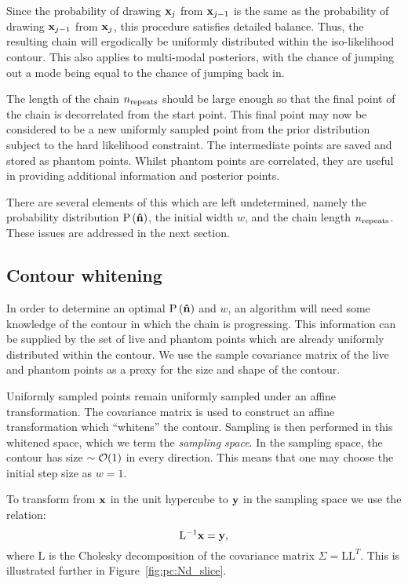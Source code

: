 Since the probability of drawing $\mathbf{x}_{j}$ from $\mathbf{x}_{j-1}$ is the same as the probability of drawing $\mathbf{x}_{j-1}$ from $\mathbf{x}_{j}$, this procedure satisfies detailed balance. Thus, the resulting chain will ergodically be uniformly distributed within the iso-likelihood contour. This also applies to multi-modal posteriors, with the chance of jumping out a mode being equal to the chance of jumping back in.

The length of the chain $n_{\mathrm{repeats}}$ should be large enough so that the final point of the chain is decorrelated from the start point. 
This final point may now be considered to be a new uniformly sampled point from the prior distribution subject to the hard likelihood constraint. The intermediate points are saved and stored as phantom points. Whilst phantom points are correlated, they are useful in providing additional information and posterior points.

There are several elements of this which are left undetermined, namely the probability distribution $\mathrm{P}\left(\mathbf{\hat{n}}\right)$, the initial width $w$, and the chain length $n_{\mathrm{repeats}}$. These issues are addressed in the next section.


\subsection{Contour whitening}
\label{sec:pc:cont_white}
In order to determine an optimal $\mathrm{P}\left(\mathbf{\hat{n}}\right)$ and $w$, an algorithm will need some knowledge of the contour in which the chain is progressing. This information can be supplied by the set of live and phantom points which are already uniformly distributed within the contour. We use the sample covariance matrix of the live and phantom points as a proxy for the size and shape of the contour.

Uniformly sampled points remain uniformly sampled under an affine transformation. The covariance matrix is used to construct an affine transformation which ``whitens'' the contour. Sampling is then performed in this whitened space, which we term the {\em sampling space}.
In the sampling space, the contour has size ${\sim\mathcal{O}{\left(1\right)}}$ in every direction. This means that one may choose the initial step size as $w=1$.

To transform from $\mathbf{x}$ in the unit hypercube to $\mathbf{y}$ in the sampling space we use the relation:
\begin{equation}
  \mathrm{L}^{-1}\mathbf{x} =  \mathbf{y},
  \label{eqn:pc:cholesky}
\end{equation}
where $\mathrm{L}$ is the Cholesky decomposition of the covariance matrix $\Sigma = \mathrm{L} \mathrm{L}^{T}$.
This is illustrated further in Figure~\ref{fig:pc:Nd_slice}.

